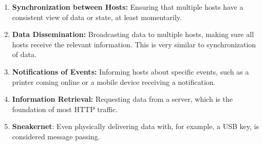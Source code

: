 \begin{enumerate}[itemsep=1pt, topsep=1pt]
    \item \textbf{Synchronization between Hosts:} Ensuring that multiple hosts have a consistent view of data or state, at least momentarily.
    \item \textbf{Data Dissemination:} Broadcasting data to multiple hosts, making sure all hosts receive the relevant information. This is very similar to synchronization of data.
    \item \textbf{Notifications of Events:} Informing hosts about specific events, such as a printer coming online or a mobile device receiving a notification.
    \item \textbf{Information Retrieval:} Requesting data from a server, which is the foundation of most HTTP traffic.
    \item \textbf{Sneakernet}: Even physically delivering data with, for example, a USB key, is considered message passing.
\end{enumerate}

